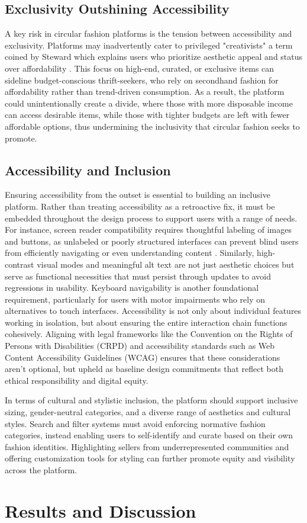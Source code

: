 \documentclass[10pt,twocolumn]{article}
\begin{document}
\subsection{Exclusivity Outshining Accessibility}
A key risk in circular fashion platforms is the tension between accessibility and exclusivity. Platforms may inadvertently cater to privileged "creativists" a term coined by Steward which explains  users who prioritize aesthetic appeal and status over affordability \cite{steward2020shirt}. This focus on high-end, curated, or exclusive items can sideline budget-conscious thrift-seekers, who rely on secondhand fashion for affordability rather than trend-driven consumption. As a result, the platform could unintentionally create a divide, where those with more disposable income can access desirable items, while those with tighter budgets are left with fewer affordable options, thus undermining the inclusivity that circular fashion seeks to promote.
\subsection{Accessibility and Inclusion}
Ensuring accessibility from the outset is essential to building an inclusive platform. Rather than treating accessibility as a retroactive fix, it must be embedded throughout the design process to support users with a range of needs. For instance, screen reader compatibility requires thoughtful labeling of images and buttons, as unlabeled or poorly structured interfaces can prevent blind users from efficiently navigating or even understanding content \cite{botelho2021accessibility}. Similarly, high-contrast visual modes and meaningful alt text are not just aesthetic choices but serve as functional necessities that must persist through updates to avoid regressions in usability. Keyboard navigability is another foundational requirement, particularly for users with motor impairments who rely on alternatives to touch interfaces. Accessibility is not only about individual features working in isolation, but about ensuring the entire interaction chain functions cohesively. Aligning with legal frameworks like the Convention on the Rights of Persons with Disabilities (CRPD) and accessibility standards such as Web Content Accessibility Guidelines (WCAG) ensures that these considerations aren’t optional, but upheld as baseline design commitments that reflect both ethical responsibility and digital equity.

In terms of cultural and stylistic inclusion, the platform should support inclusive sizing, gender-neutral categories, and a diverse range of aesthetics and cultural styles. Search and filter systems must avoid enforcing normative fashion categories, instead enabling users to self-identify and curate based on their own fashion identities. Highlighting sellers from underrepresented communities and offering customization tools for styling can further promote equity and visibility across the platform.








\section{Results and Discussion}





\appendix


\printbibliography
\end{document}
